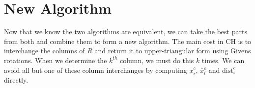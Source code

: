 \documentclass[conference]{IEEEtran}
\newcommand{\dist}{\mathrm{dist}}
\begin{document}
\begin{comment}
Originally we have $\bar{y} =Q_1^Ty$. Let $\bar{y}^{(2)}
\in\mathbb{R}^{n-1}$ denote $\bar{y}$ in the second step of the CH
algorithm and $y^{(2)} \in\mathbb{R}^n$ denote $y$ in the second step
of SW. We must show that $\bar{y}^{(2)} = (Q^Ty^{(2)})_{1:n-1}$ and
$(Q^Ty^{(2)})_n = 0$.
\begin{align*}
(Q^Ty^{(2)})_i &= q_i^T(I-\frac{g_ng_n^T}{g_n^Tg_n})(y-h_nz_n) \\
&= (q_i^T - q_i^T\frac{g_ng_n^T}{g_n^Tg_n})(y-h_nz_n)
\end{align*}
This can be simplified by observing that $Q^TG$ is lower triangular.
\begin{align*}
Q^TG &= Q^T(QR)^{-T} \\
&=R^{-T}
\end{align*}
So $q_i^Tg_n = 0$ for $i=1,\dots,n-1$. When $i=n$, we have $g_n =
q_nR^{-T}_{n,n}$.
Because $Q$ is orthogonal, this
means $q_n=\frac{g_n}{\left \| g_n \right \|}$ which implies $(q_n^T -
q_n^T\frac{g_ng_n^T}{g_n^Tg_n}) = 0$. So now for $i \ne n$ we have $(q_i^T -
q_i^T\frac{g_ng_n^T}{g_n^Tg_n})(y-h_nz_n) = q_i^Ty_n - q_i^Th_nz_n$. And since
$R = Q^TH$ implies $r_{i,j} = q_i^Th_j$, we have 
\begin{align*}
q_i^Ty - q_i^Th_nz_n &= q_i^Ty - r_{i,n}z_n \\
&= \bar{y}^{(2)} 
\end{align*}
Now we know $\bar{y}^{(2)} = (Q^Ty^{(2)})_{1:n-1}$, and from \cite{Cli64} we
know that the updated $G$ for the second step of the algorithm is the
pseudoinverse of $H$ with the column that we swapped for the $n^{th}$ removed
(this can also be easily verified). This implies that
the subproblems in the second step of each algorithm are equivalent.
\end{comment}





\section{New Algorithm}


Now that we know the two algorithms are equivalent, we can take the best
parts from both and combine them to form a new algorithm. 
The main cost in CH is to interchange the columns of $R$ and return it to
upper-triangular form using Givens rotations. 
When we determine the $k^{th}$ column,  we must do this $k$ times. 
We can avoid all but one of these column interchanges by computing $x_i^c$, 
$\bar{x}_i^c$ and $\dist_i^c$ directly. 
\end{document}
